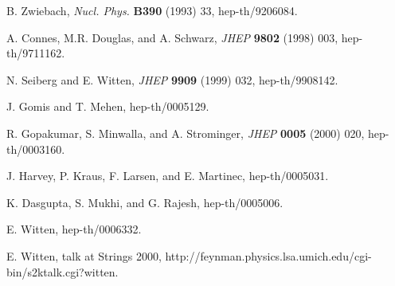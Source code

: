 \documentclass[a4paper,12pt]{article}
\begin{document}
\begin{thebibliography}{99}
 B. Zwiebach, {\it Nucl. Phys.} {\bf B390} (1993) 33, hep-th/9206084.

 A. Connes, M.R. Douglas, and A. Schwarz, {\it JHEP} {\bf 9802} (1998) 003,
hep-th/9711162.

 N. Seiberg and E. Witten, {\it JHEP} {\bf 9909} (1999) 032,
hep-th/9908142.

 J. Gomis and T. Mehen, hep-th/0005129.

 R. Gopakumar, S. Minwalla, and A. Strominger,
{\it JHEP} {\bf 0005} (2000) 020,
hep-th/0003160.

 J. Harvey, P. Kraus, F. Larsen, and E. Martinec, hep-th/0005031.

 K. Dasgupta, S. Mukhi, and G. Rajesh,
hep-th/0005006.

 E. Witten, hep-th/0006332.

 E. Witten, talk at Strings 2000, http://feynman.physics.lsa.umich.edu/cgi-bin/s2ktalk.cgi?witten.

\end{thebibliography}
\end{document}
